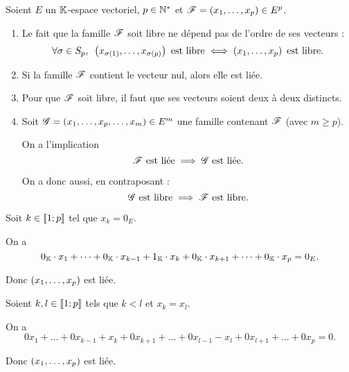 \begin{rem}
Soient \(E\) un \(\mathbb{K}\)-espace vectoriel, \(p\in\mathbb{N}^*\) et \(\mathscr{F}=\left(x_1,\dots,x_p\right)\in E^p\).

\begin{enumerate}
\item Le fait que la famille \(\mathscr{F}\) soit libre ne dépend pas de l'ordre de ses vecteurs : \[\quantifs{\forall\sigma\in S_p}\paren{x_{\sigma\paren{1}},\dots,x_{\sigma\paren{p}}}\text{ est libre}\ssi\paren{x_1,\dots,x_p}\text{ est libre}.\]

\item Si la famille \(\mathscr{F}\) contient le vecteur nul, alors elle est liée. \\

\item Pour que \(\mathscr{F}\) soit libre, il faut que ses vecteurs soient deux à deux distincts. \\

\item Soit \(\mathscr{G}=\left(x_1,\dots,x_p,\dots,x_m\right)\in E^m\) une famille contenant \(\mathscr{F}\) (avec \(m\geq p\)).

On a l'implication \[\mathscr{F}\text{ est liée}\implies\mathscr{G}\text{ est liée}.\]

On a donc aussi, en contraposant : \[\mathscr{G}\text{ est libre}\implies\mathscr{F}\text{ est libre}.\]
\end{enumerate}
\end{rem}

\begin{dem}[2]
Soit \(k\in\left\llbracket1;p\right\rrbracket\) tel que \(x_k=0_E\).

On a \[0_{\mathbb{K}}\cdot x_1+\dots+0_{\mathbb{K}}\cdot x_{k-1}+1_{\mathbb{K}}\cdot x_k+0_{\mathbb{K}}\cdot x_{k+1}+\dots+0_{\mathbb{K}}\cdot x_p=0_E.\]

Donc \(\left(x_1,\dots,x_p\right)\) est liée.
\end{dem}

\begin{dem}[3]
Soient \(k,l\in\left\llbracket1;p\right\rrbracket\) tels que \(k<l\) et \(x_k=x_l\).

On a \[0x_1+\dots+0x_{k-1}+x_k+0x_{k+1}+\dots+0x_{l-1}-x_l+0x_{l+1}+\dots+0x_p=0.\]

Donc \(\left(x_1,\dots,x_p\right)\) est liée.
\end{dem}

